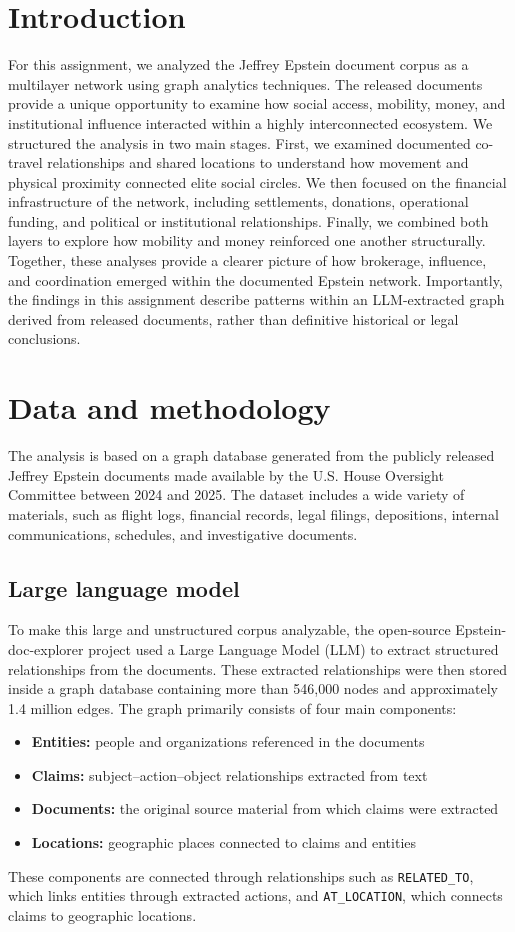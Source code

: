 \section{Introduction}
For this assignment, we analyzed the Jeffrey Epstein document corpus as a multilayer network using graph analytics techniques. The released documents provide a unique opportunity to examine how social access, mobility, money, and institutional influence interacted within a highly interconnected ecosystem.
We structured the analysis in two main stages. First, we examined documented co-travel relationships and shared locations to understand how movement and physical proximity connected elite social circles. We then focused on the financial infrastructure of the network, including settlements, donations, operational funding, and political or institutional relationships.
Finally, we combined both layers to explore how mobility and money reinforced one another structurally. Together, these analyses provide a clearer picture of how brokerage, influence, and coordination emerged within the documented Epstein network.
Importantly, the findings in this assignment describe patterns within an LLM-extracted graph derived from released documents, rather than definitive historical or legal conclusions.
\section{Data and methodology}
The analysis is based on a graph database generated from the publicly released Jeffrey Epstein documents made available by the U.S. House Oversight Committee between 2024 and 2025. The dataset includes a wide variety of materials, such as flight logs, financial records, legal filings, depositions, internal communications, schedules, and investigative documents.
\subsection{Large language model}
To make this large and unstructured corpus analyzable, the open-source Epstein-doc-explorer project used a Large Language Model (LLM) to extract structured relationships from the documents. These extracted relationships were then stored inside a graph database containing more than 546,000 nodes and approximately 1.4 million edges.
The graph primarily consists of four main components:
\begin{itemize}
    \item \textbf{Entities:} people and organizations referenced in the documents
    \item \textbf{Claims:} subject--action--object relationships extracted from text
    \item \textbf{Documents:} the original source material from which claims were extracted
    \item \textbf{Locations:} geographic places connected to claims and entities
\end{itemize}
These components are connected through relationships such as \texttt{RELATED\_TO}, which links entities through extracted actions, and \texttt{AT\_LOCATION}, which connects claims to geographic locations.

